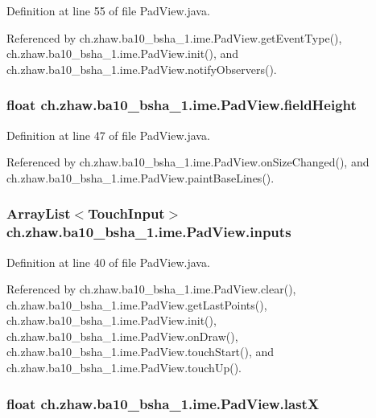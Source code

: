 Definition at line 55 of file PadView.java.

Referenced by ch.zhaw.ba10\_\-bsha\_\-1.ime.PadView.getEventType(), ch.zhaw.ba10\_\-bsha\_\-1.ime.PadView.init(), and ch.zhaw.ba10\_\-bsha\_\-1.ime.PadView.notifyObservers().\hypertarget{classch_1_1zhaw_1_1ba10__bsha__1_1_1ime_1_1PadView_a2d40bd61174101fd313d5964a0ae0ab2}{
\subsubsection[{fieldHeight}]{\setlength{\rightskip}{0pt plus 5cm}float {\bf ch.zhaw.ba10\_\-bsha\_\-1.ime.PadView.fieldHeight}}}
\label{classch_1_1zhaw_1_1ba10__bsha__1_1_1ime_1_1PadView_a2d40bd61174101fd313d5964a0ae0ab2}


Definition at line 47 of file PadView.java.

Referenced by ch.zhaw.ba10\_\-bsha\_\-1.ime.PadView.onSizeChanged(), and ch.zhaw.ba10\_\-bsha\_\-1.ime.PadView.paintBaseLines().\hypertarget{classch_1_1zhaw_1_1ba10__bsha__1_1_1ime_1_1PadView_a73761fbcb4c8d5848fa88f6293d12519}{
\subsubsection[{inputs}]{\setlength{\rightskip}{0pt plus 5cm}ArrayList$<${\bf TouchInput}$>$ {\bf ch.zhaw.ba10\_\-bsha\_\-1.ime.PadView.inputs}}}
\label{classch_1_1zhaw_1_1ba10__bsha__1_1_1ime_1_1PadView_a73761fbcb4c8d5848fa88f6293d12519}


Definition at line 40 of file PadView.java.

Referenced by ch.zhaw.ba10\_\-bsha\_\-1.ime.PadView.clear(), ch.zhaw.ba10\_\-bsha\_\-1.ime.PadView.getLastPoints(), ch.zhaw.ba10\_\-bsha\_\-1.ime.PadView.init(), ch.zhaw.ba10\_\-bsha\_\-1.ime.PadView.onDraw(), ch.zhaw.ba10\_\-bsha\_\-1.ime.PadView.touchStart(), and ch.zhaw.ba10\_\-bsha\_\-1.ime.PadView.touchUp().\hypertarget{classch_1_1zhaw_1_1ba10__bsha__1_1_1ime_1_1PadView_ab132a8e8a4f00924500f87483cff2a98}{
\subsubsection[{lastX}]{\setlength{\rightskip}{0pt plus 5cm}float {\bf ch.zhaw.ba10\_\-bsha\_\-1.ime.PadView.lastX}}}
\label{classch_1_1zhaw_1_1ba10__bsha__1_1_1ime_1_1PadView_ab132a8e8a4f00924500f87483cff2a98}


